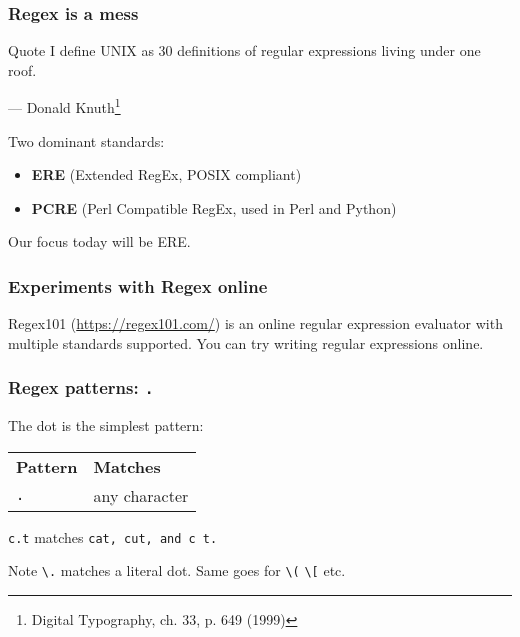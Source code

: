 \begin{frame}
    \frametitle{Regex is a mess}
    \begin{block}{Quote}
        I define UNIX as 30 definitions of regular expressions living under one roof.
        \begin{flushright}
            — Donald Knuth\footnote{Digital Typography, ch. 33, p. 649 (1999)}
        \end{flushright}
    \end{block}

    Two dominant standards:
    \begin{itemize}
        \item \textbf{ERE} (Extended RegEx, POSIX compliant)
        \item \textbf{PCRE} (Perl Compatible RegEx, used in Perl and Python)
    \end{itemize}
    Our focus today will be ERE.
\end{frame}

\begin{frame}[fragile]
    \frametitle{Experiments with Regex online}
    Regex101 (\url{https://regex101.com/}) is an online regular expression evaluator with multiple standards supported. You can try writing regular expressions online.
\end{frame}

\begin{frame}[fragile]
    \frametitle{Regex patterns: \tt{.}}
    The dot is the simplest pattern:
    \begin{table}
        \centering
        \begin{tabular}{ll}
            \textbf{Pattern} & \textbf{Matches} \\
            \verb|.|         & any character    \\
        \end{tabular}
    \end{table}

    \begin{example}
        \verb|c.t| matches \tt{cat}, \tt{cut}, and \tt{c t}.
    \end{example}

    \begin{block}{Note}
        \verb|\.| matches a literal dot. Same goes for \verb|\(| \verb|\[| etc.
    \end{block}
\end{frame}

